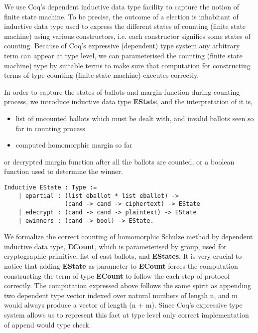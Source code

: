 \documentclass{llncs}
\begin{document}
 We use Coq's dependent inductive data type facility to capture the notion of 
  finite state machine. To  be precise, the outcome
  of a election
 is inhabitant of inductive data type used to express the 
  different states of counting (finite state machine) using various constructors, 
  i.e. each constructor signifies some states of counting. Because of Coq's
  expressive (dependent) type system any arbitrary term can appear at type level, 
  we can  parameterised the counting (finite state machine) type by suitable 
  terms to  make sure that computation for constructing terms of type counting (finite 
  state machine) executes correctly.
 
  
 
 In order to capture the states of ballots and margin function during counting process, 
 we introduce inductive data type \textbf{EState}, and the interpretation of it is,  
  \begin{itemize}
  \item list of uncounted ballots which must be dealt with, 
  	and invalid ballots seen so far in counting process
  \item computed homomorphic margin so far
  \end{itemize}
  or decrypted margin function after all the ballots are counted, 
  or a boolean function used to determine the winner.
  
  
  
\begin{verbatim}
Inductive EState : Type :=
    | epartial : (list eballot * list eballot) ->
                 (cand -> cand -> ciphertext) -> EState
    | edecrypt : (cand -> cand -> plaintext) -> EState
    | ewinners : (cand -> bool) -> EState.
\end{verbatim}

We formalize the correct counting of homomorphic Schulze method by dependent inductive 
data type, \textbf{ECount}, which is parameterised by group, used for cryptographic 
primitive, list of cast ballots, and \textbf{EStates}. It is very crucial to 
notice that adding  \textbf{EState} as parameter to \textbf{ECount} forces the
 computation constructing the term of type \textbf{ECount} to follow the each step of protocol
  correctly. The computation expressed above follows 
  the same spirit as appending two dependent type 
  vector indexed over natural numbers of length n, and m would always 
  produce a vector of length  (n + m). Since Coq's expressive type system allows 
  us to represent this fact at type level only correct implementation of 
  append would type check.
\end{document}

